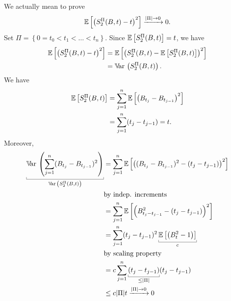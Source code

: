 \documentclass[12pt]{report}
\begin{document}
\begin{fancyproof}
	We actually mean to prove 
	\begin{equation*}
		\mathbb{E}\left[\left(S^{\Pi}_{2}(B,t)-t\right)^{2}\right]\xrightarrow{|\Pi|\to0}0.
	\end{equation*}
	Set $\Pi=\left\{0=t_{0}<t_{1}<\ldots<t_{n}\right\}$. Since $\mathbb{E}\left[S_{2}^{\Pi}(B,t)\right]=t$, we have
	\begin{align*}
		\mathbb{E}\left[\left(S^{\Pi}_{2}(B,t)-t\right)^{2}\right]&=\mathbb{E}\left[\left(S^{\Pi}_{2}(B,t)-\mathbb{E}\left[S_{2}^{\Pi}(B,t)\right]\right)^{2}\right]\\
		&=\mathbb{V}\!\mathrm{ar}\,\left(S_{2}^{\Pi}(B,t)\right).
	\end{align*}
	We have
	\begin{align*}
		\mathbb{E}\left[S^{\Pi}_{2}(B,t)\right]&=\sum_{j=1}^{n}\mathbb{E}\left[\left(B_{t_{j}}-B_{t_{j-1}}\right)^{2}\right]\\
		&=\sum_{j=1}^{n}(t_{j}-t_{j-1})=t.
	\end{align*}
	Moreover,
	\begin{align*}
		\ubracketthin{\var\left(\sum_{j=1}^{n}(B_{t_{j}}-B_{t_{j-1}})^{2}\right)}_{\var\left(S_{2}^{\Pi}(B,t)\right)}&=\sum_{j=1}^{n}\ev{\left((B_{t_{j}}-B_{t_{j-1}})^{2}-(t_{j}-t_{j-1})\right)^{2}}\\
		&\text{by indep. increments}\\
		&=\sum_{j=1}^{n}\ev{\left(B^{2}_{t_{j}-t_{j-1}}-(t_{j}-t_{j-1})\right)^{2}}\\
		&=\sum_{j=1}^{n}(t_{j}-t_{j-1})^{2}\ubracketthin{\ev{\left(B_{t}^{2}-1\right)}}_{c}\\
		&\text{by scaling property}\\
		&=c\sum_{j=1}^{n}\ubracketthin{(t_{j}-t_{j-1})}_{\leq|\Pi|}(t_{j}-t_{j-1})\\
		&\leq c|\Pi|t\xrightarrow{|\Pi|\to0}0
	\end{align*}
\end{fancyproof}
\end{document}
